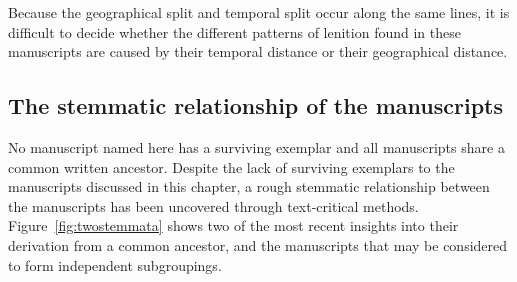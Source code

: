 Because the geographical split and temporal split occur along the same lines, it is difficult to decide whether the different patterns of lenition found in these manuscripts are caused by their temporal distance or their geographical distance.

\subsection{The stemmatic relationship of the manuscripts}
\label{sec:stemmata}
No manuscript named here has a surviving exemplar and all manuscripts share a common written ancestor. Despite the lack of surviving exemplars to the manuscripts discussed in this chapter, a rough stemmatic relationship between the manuscripts has been uncovered through text-critical methods. Figure~\ref{fig:twostemmata} shows two of the most recent insights into their derivation from a common ancestor, and the manuscripts that may be considered to form independent subgroupings.

